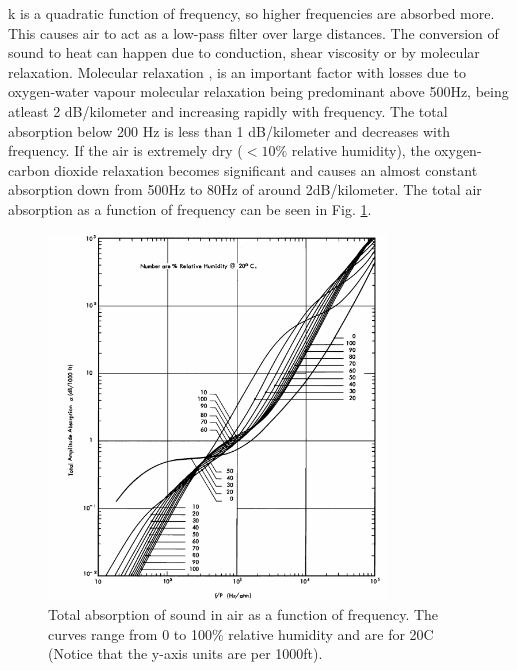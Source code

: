 k is a quadratic function of frequency, so higher frequencies are absorbed more. This causes air to act as a low-pass filter over large distances. 
The conversion of sound to heat can happen due to conduction, shear viscosity or by molecular relaxation. Molecular relaxation \cite{bass1990atmospheric}, \cite{evans1972atmospheric} is an important factor with losses due to oxygen-water vapour molecular relaxation being predominant above 500Hz, being atleast 2 dB/kilometer and increasing rapidly with frequency. The total absorption below 200 Hz is less than 1 dB/kilometer and decreases with frequency. If the air is extremely dry ($< 10\%$ relative humidity), the oxygen-carbon dioxide relaxation becomes significant and causes an almost constant absorption down from 500Hz to 80Hz of around 2dB/kilometer. The total air absorption as a function of frequency can be seen in Fig. \ref{Fig:airAbsorption}.

\begin{figure}
\includegraphics[width=0.8\textwidth]{Figures/airAbsorption.png}
\caption{Total absorption of sound in air as a function of frequency. The curves range from 0 to 100\% relative humidity and are for 20\degree C \cite{evans1972atmospheric} (Notice that the y-axis units are per 1000ft).}
\label{Fig:airAbsorption}
\end{figure}

